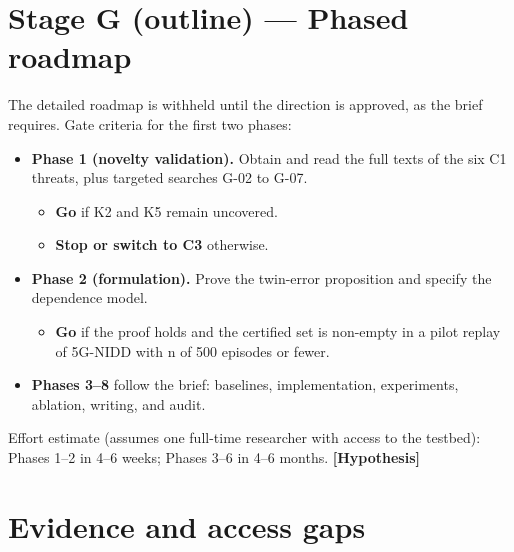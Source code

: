 \hypertarget{sec:roadmap}{%
\section{Stage G (outline) --- Phased roadmap}\label{sec:roadmap}}

The detailed roadmap is withheld until the direction is approved, as the
brief requires. Gate criteria for the first two phases:

\begin{itemize}
\tightlist
\item
  \textbf{Phase 1 (novelty validation).} Obtain and read the full texts
  of the six C1 threats, plus targeted searches G-02 to G-07.

  \begin{itemize}
  \tightlist
  \item
    \textbf{Go} if K2 and K5 remain uncovered.
  \item
    \textbf{Stop or switch to C3} otherwise.
  \end{itemize}
\item
  \textbf{Phase 2 (formulation).} Prove the twin-error proposition and
  specify the dependence model.

  \begin{itemize}
  \tightlist
  \item
    \textbf{Go} if the proof holds and the certified set is non-empty in
    a pilot replay of 5G-NIDD with n of 500 episodes or fewer.
  \end{itemize}
\item
  \textbf{Phases 3--8} follow the brief: baselines, implementation,
  experiments, ablation, writing, and audit.
\end{itemize}

Effort estimate (assumes one full-time researcher with access to the
testbed): Phases 1--2 in 4--6 weeks; Phases 3--6 in 4--6 months.
\textbf{{[}Hypothesis{]}}

\hypertarget{sec:gaps}{%
\section{Evidence and access gaps}\label{sec:gaps}}


